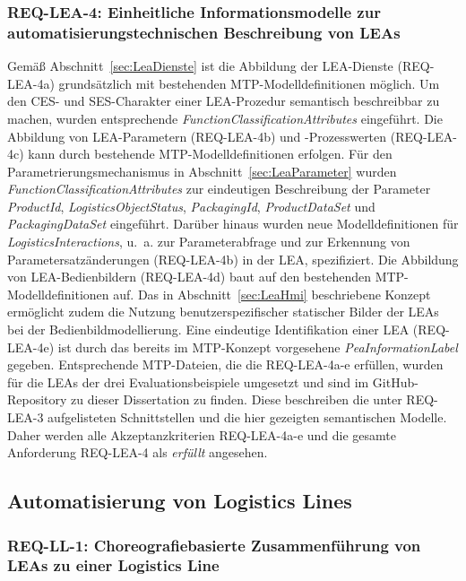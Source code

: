 \subsubsection{REQ-LEA-4: Einheitliche Informationsmodelle zur automatisierungstechnischen Beschreibung von LEAs}

Gemäß Abschnitt~\ref{sec:LeaDienste} ist die Abbildung der LEA-Dienste (REQ-LEA-4a) grund\-sätz\-lich mit bestehenden MTP-Modelldefinitionen möglich. Um den CES- und SES-Charakter einer LEA-Prozedur semantisch beschreibbar zu machen, wurden entsprechende \emph{FunctionClassificationAttributes} eingeführt. Die Abbildung von LEA-Parametern (REQ-LEA-4b) und -Prozesswerten (REQ-LEA-4c) kann durch bestehende MTP-Modelldefinitionen erfolgen. Für den Parametrierungsmechanismus in Abschnitt~\ref{sec:LeaParameter} wurden \emph{FunctionClassificationAttributes} zur eindeutigen Beschreibung der Parameter \emph{ProductId}, \emph{LogisticsObjectStatus}, \emph{PackagingId}, \emph{ProductDataSet} und \emph{PackagingDataSet} eingeführt. Darüber hinaus wurden neue Modelldefinitionen für \emph{LogisticsInteractions}, u.~a. zur Parameterabfrage und zur Erkennung von Parametersatzänderungen (REQ-LEA-4b) in der LEA, spezifiziert. Die Abbildung von LEA-Bedienbildern (REQ-LEA-4d) baut auf den bestehenden MTP-Modelldefinitionen auf. Das in Abschnitt~\ref{sec:LeaHmi} beschriebene Konzept ermöglicht zudem die Nutzung benutzerspezifischer statischer Bilder der LEAs bei der Bedienbildmodellierung. Eine eindeutige Identifikation einer LEA (REQ-LEA-4e) ist durch das bereits im MTP-Konzept vorgesehene \emph{PeaInformationLabel} gegeben. Entsprechende MTP-Dateien, die die REQ-LEA-4a-e erfüllen, wurden für die LEAs der drei Evaluationsbeispiele umgesetzt und sind im GitHub-Repository zu dieser Dissertation \cite{Blumenstein.Github} zu finden. Diese beschreiben die unter REQ-LEA-3 aufgelisteten Schnittstellen und die hier gezeigten semantischen Modelle. Daher werden alle Akzeptanzkriterien REQ-LEA-4a-e und die gesamte Anforderung REQ-LEA-4 als \emph{erfüllt} angesehen.

\subsection{Automatisierung von Logistics Lines}

\subsubsection{REQ-LL-1: Choreografiebasierte Zusammenführung von LEAs zu einer Logistics Line}

